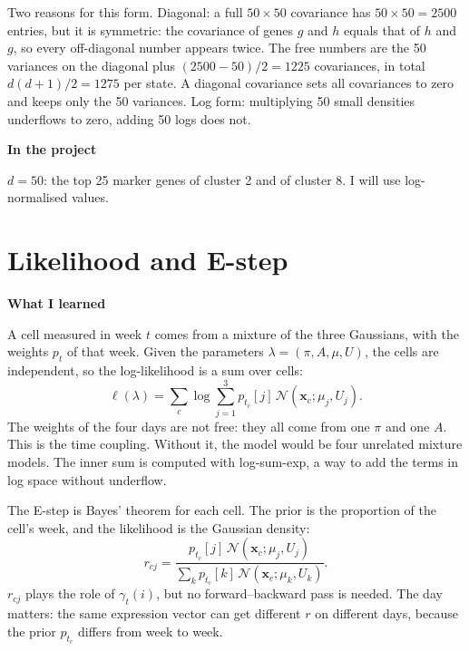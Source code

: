\documentclass[10pt,a4paper]{article}
\newcommand{\sub}[1]{\vspace{1pt}\textbf{\textcolor{gray!80!black}{#1}}\par}
\begin{document}
Two reasons for this form. Diagonal: a full $50 \times 50$ covariance has $50 \times 50 = 2500$ entries, but it is symmetric: the covariance of genes $g$ and $h$ equals that of $h$ and $g$, so every off-diagonal number appears twice. The free numbers are the 50 variances on the diagonal plus $(2500 - 50)/2 = 1225$ covariances, in total $d(d+1)/2 = 1275$ per state. A diagonal covariance sets all covariances to zero and keeps only the 50 variances. Log form: multiplying 50 small densities underflows to zero, adding 50 logs does not.

\sub{In the project}
$d = 50$: the top 25 marker genes of cluster 2 and of cluster 8. I will use log-normalised values.

\section{Likelihood and E-step}

\sub{What I learned}
A cell measured in week $t$ comes from a mixture of the three Gaussians, with the weights $p_t$ of that week. Given the parameters $\lambda = (\pi, A, \mu, U)$, the cells are independent, so the log-likelihood is a sum over cells:
\[
\ell(\lambda) = \sum_{c} \log \sum_{j=1}^{3} p_{t_c}[j]\, \mathcal{N}(\mathbf{x}_c; \mu_j, U_j).
\]
The weights of the four days are not free: they all come from one $\pi$ and one $A$. This is the time coupling. Without it, the model would be four unrelated mixture models. The inner sum is computed with log-sum-exp, a way to add the terms in log space without underflow.

The E-step is Bayes' theorem for each cell. The prior is the proportion of the cell's week, and the likelihood is the Gaussian density:
\[
r_{cj} = \frac{p_{t_c}[j]\, \mathcal{N}(\mathbf{x}_c; \mu_j, U_j)}{\sum_{k} p_{t_c}[k]\, \mathcal{N}(\mathbf{x}_c; \mu_k, U_k)} .
\]
$r_{cj}$ plays the role of $\gamma_t(i)$, but no forward--backward pass is needed. The day matters: the same expression vector can get different $r$ on different days, because the prior $p_{t_c}$ differs from week to week.
\end{document}
